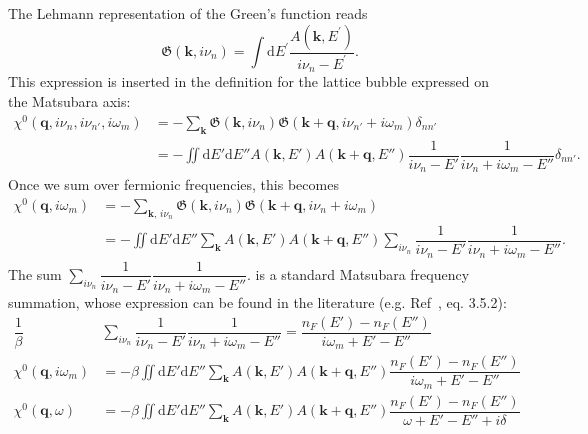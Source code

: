\documentclass[preprint,prb,amsmath,superscriptaddress,showpacs]{revtex4}
\newcommand{\bk}{\mathbf{k}}
\newcommand{\bq}{\mathbf{q}}
\begin{document}
The Lehmann representation of the
Green's function reads
% 
\begin{equation}
  \mathfrak{G}(\mathbf{k}, i\nu_n) =
  \int \mathrm{d}E^{\prime}
  \frac{A(\mathbf{k}, E^{\prime})}{i\nu_n - E^{\prime}}.
\end{equation}
%
This expression is inserted in the definition for the lattice bubble
expressed on the Matsubara axis\cite{Boehnke2011, Kunes2011}:
%
\begin{equation}
  \begin{aligned}
      \chi^0(\bq, i\nu_n, i\nu_{n'}, i \omega_m) &=
      - \sum_{\bk}
      \mathfrak{G}(\bk, i\nu_n)
      \mathfrak{G}(\bk + \bq, i\nu_{n'} + i\omega_m) \delta_{n n'} \\
      &= - \iint
      \mathrm{d}E'
      \mathrm{d}E''
      A(\bk, E') 
      A(\bk + \bq, E'')
      \dfrac{1}{i\nu_n - E'}
      \dfrac{1}{i\nu_{n} + i \omega_m - E''}\delta_{n n'}.
    \end{aligned}
  \end{equation}
Once we sum over fermionic frequencies, this becomes 
%
\begin{equation}
  \begin{aligned}
    \chi^0(\bq, i \omega_m) &=
    - \sum_{\bk, \, i\nu_n}
    \mathfrak{G}(\bk, i\nu_n)
    \mathfrak{G}(\bk + \bq, i\nu_{n} + i\omega_m) \\
    &= - \iint
    \mathrm{d}E'
    \mathrm{d}E''
    \sum_{\bk} A(\bk, E') 
      A(\bk + \bq, E'')
      \sum_{i\nu_n}
    \dfrac{1}{i\nu_n - E'}
    \dfrac{1}{i\nu_{n} + i \omega_m - E''}.
    \end{aligned}
\end{equation}
%
The sum $\sum_{i\nu_n} \dfrac{1}{i\nu_n - E'} \dfrac{1}{i\nu_{n} + i
  \omega_m - E''}.$ is a standard Matsubara frequency summation, whose
expression can be found in the literature (e.g. Ref~,
eq. 3.5.2):
\begin{equation}
  \begin{aligned}
    \label{eq:continuation}
    \dfrac{1}{\beta} &
    \sum_{i\nu_n}
    \dfrac{1}{i\nu_n - E'}
    \dfrac{1}{i\nu_{n} + i \omega_m - E''} =
    \dfrac{n_F(E') - n_F(E'')}
    {i\omega_m + E' - E''} \\
    \chi^0(\bq, i \omega_m)
    &= - \beta
    \iint
    \mathrm{d}E'
    \mathrm{d}E''
    \sum_{\bk} A(\bk, E') 
    A(\bk + \bq, E'')
    \dfrac{n_F(E') - n_F(E'')}
    {i\omega_m + E' - E''} \\
    \chi^0(\bq, \omega)
    &= - \beta
    \iint
    \mathrm{d}E'
    \mathrm{d}E''
    \sum_{\bk} A(\bk, E') 
    A(\bk + \bq, E'')
    \dfrac{n_F(E') - n_F(E'')}
    {\omega + E' - E'' + i\delta} \\
    \end{aligned}
\end{equation}
\end{document}
